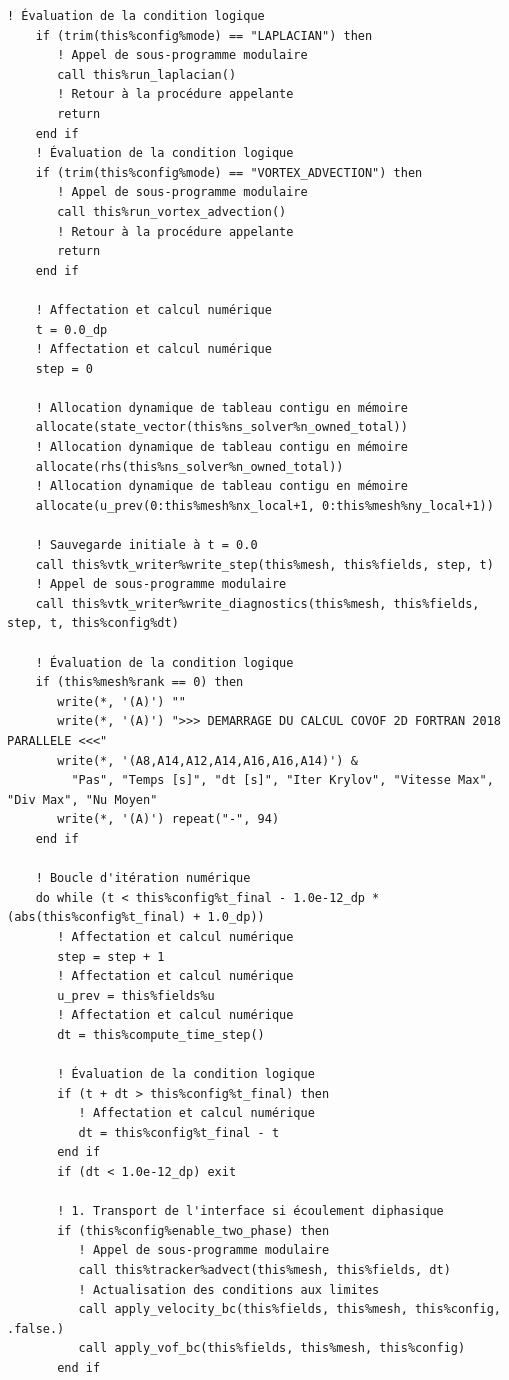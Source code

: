 \documentclass[10pt,a4paper,oneside]{book}
\begin{document}
\begin{lstlisting}[language={[95]Fortran}]
    ! Évaluation de la condition logique
    if (trim(this%config%mode) == "LAPLACIAN") then
       ! Appel de sous-programme modulaire
       call this%run_laplacian()
       ! Retour à la procédure appelante
       return
    end if
    ! Évaluation de la condition logique
    if (trim(this%config%mode) == "VORTEX_ADVECTION") then
       ! Appel de sous-programme modulaire
       call this%run_vortex_advection()
       ! Retour à la procédure appelante
       return
    end if

    ! Affectation et calcul numérique
    t = 0.0_dp
    ! Affectation et calcul numérique
    step = 0

    ! Allocation dynamique de tableau contigu en mémoire
    allocate(state_vector(this%ns_solver%n_owned_total))
    ! Allocation dynamique de tableau contigu en mémoire
    allocate(rhs(this%ns_solver%n_owned_total))
    ! Allocation dynamique de tableau contigu en mémoire
    allocate(u_prev(0:this%mesh%nx_local+1, 0:this%mesh%ny_local+1))

    ! Sauvegarde initiale à t = 0.0
    call this%vtk_writer%write_step(this%mesh, this%fields, step, t)
    ! Appel de sous-programme modulaire
    call this%vtk_writer%write_diagnostics(this%mesh, this%fields, step, t, this%config%dt)

    ! Évaluation de la condition logique
    if (this%mesh%rank == 0) then
       write(*, '(A)') ""
       write(*, '(A)') ">>> DEMARRAGE DU CALCUL COVOF 2D FORTRAN 2018 PARALLELE <<<"
       write(*, '(A8,A14,A12,A14,A16,A16,A14)') &
         "Pas", "Temps [s]", "dt [s]", "Iter Krylov", "Vitesse Max", "Div Max", "Nu Moyen"
       write(*, '(A)') repeat("-", 94)
    end if

    ! Boucle d'itération numérique
    do while (t < this%config%t_final - 1.0e-12_dp * (abs(this%config%t_final) + 1.0_dp))
       ! Affectation et calcul numérique
       step = step + 1
       ! Affectation et calcul numérique
       u_prev = this%fields%u
       ! Affectation et calcul numérique
       dt = this%compute_time_step()

       ! Évaluation de la condition logique
       if (t + dt > this%config%t_final) then
          ! Affectation et calcul numérique
          dt = this%config%t_final - t
       end if
       if (dt < 1.0e-12_dp) exit

       ! 1. Transport de l'interface si écoulement diphasique
       if (this%config%enable_two_phase) then
          ! Appel de sous-programme modulaire
          call this%tracker%advect(this%mesh, this%fields, dt)
          ! Actualisation des conditions aux limites
          call apply_velocity_bc(this%fields, this%mesh, this%config, .false.)
          call apply_vof_bc(this%fields, this%mesh, this%config)
       end if


\end{lstlisting}
\end{document}
